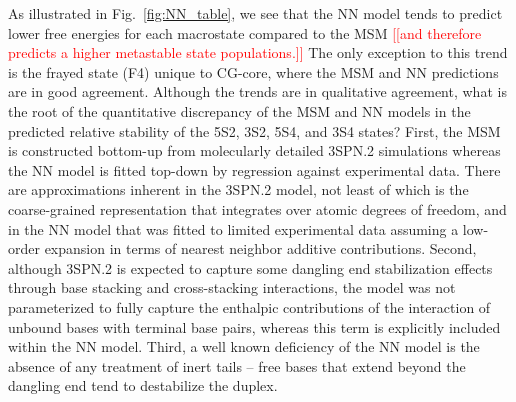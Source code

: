 \documentclass[journal=jpcbfk,manuscript=article]{achemso}
\newcommand*{\noter}[1]{\textcolor{red}{[[#1]]}}		%
\begin{document}
As illustrated in Fig.~\ref{fig:NN_table}, we see that the NN model tends to predict lower free energies for each macrostate compared to the MSM \noter{and therefore predicts a higher metastable state populations.} The only exception to this trend is the frayed state (F4) unique to CG-core, where the MSM and NN predictions are in good agreement. Although the trends are in qualitative agreement, what is the root of the quantitative discrepancy of the MSM and NN models in the predicted relative stability of the 5S2, 3S2, 5S4, and 3S4 states? First, the MSM is constructed bottom-up from molecularly detailed 3SPN.2 simulations whereas the NN model is fitted top-down by regression against experimental data. There are approximations inherent in the 3SPN.2 model, not least of which is the coarse-grained representation that integrates over atomic degrees of freedom, and in the NN model that was fitted to limited experimental data assuming a low-order expansion in terms of nearest neighbor additive contributions. Second, although 3SPN.2 is expected to capture some dangling end stabilization effects through base stacking and cross-stacking interactions, the model was not parameterized to fully capture the enthalpic contributions of the interaction of unbound bases with terminal base pairs, whereas this term is explicitly included within the NN model. Third, a well known deficiency of the NN model is the absence of any treatment of inert tails -- free bases that extend beyond the dangling end tend to destabilize the duplex.\citep{DiMichele2014EffectHybridization}

\end{document}

